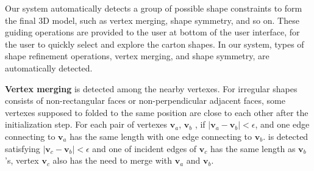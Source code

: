 Our system  automatically detects a group of possible shape constraints to form the final 3D model, such as vertex merging, shape symmetry, and so on. 
%
These guiding operations are provided to the user at bottom of the user interface, for the user to quickly select and explore the carton shapes.
In our system,  types of shape refinement operations, vertex merging, and shape symmetry, are automatically detected.

%

\noindent
\textbf{Vertex merging} is detected among the nearby vertexes. 
For irregular shapes consists of non-rectangular faces or non-perpendicular adjacent faces, some vertexes supposed to folded to the same position are close to each other after the initialization step. 
For each pair of vertexes $\mathbf{v}_a$, $\mathbf{v}_b$ {\color{blue}{that in the nonadjacent face}}, if $|\mathbf{v}_a-\mathbf{v}_b|<\epsilon$, and one edge connecting to $\mathbf{v}_a$ has the same length with one edge connecting to $\mathbf{v}_b$.
{ is detected satisfying $|\mathbf{v}_c-\mathbf{v}_b|<\epsilon$ and one of incident edges of $\mathbf{v}_c$ has the same length as $\mathbf{v}_b$'s, vertex $\mathbf{v}_c$ also has the need to merge with $\mathbf{v}_a$ and $\mathbf{v}_b$.}

